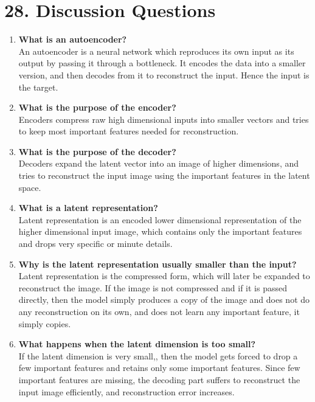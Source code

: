 \documentclass[10pt]{article}
\begin{document}
\section*{28. Discussion Questions}

\begin{enumerate}

\item \textbf{What is an autoencoder?}\\
An autoencoder is a neural network which reproduces its own input as its output by passing it through a bottleneck. It encodes the data into a smaller version, and then decodes from it to reconstruct the input. Hence the input is the target.\\

\item \textbf{What is the purpose of the encoder?}\\
Encoders compress raw high dimensional inputs into smaller vectors and tries to keep most important features needed for reconstruction. \\

\item \textbf{What is the purpose of the decoder?}\\
Decoders expand the latent vector into an image of higher dimensions, and tries to reconstruct the input image using the important features in the latent space.\\

\item \textbf{What is a latent representation?}\\
Latent representation is an encoded lower dimensional representation of the higher dimensional input image, which contains only the important features and drops very specific or minute details.\\

\item \textbf{Why is the latent representation usually smaller than the input?}\\
Latent representation is the compressed form, which will later be expanded to reconstruct the image. If the image is not compressed and if it is passed directly, then the model simply produces a copy of the image and does not do any reconstruction on its own, and does not learn any important feature, it simply copies.\\

\item \textbf{What happens when the latent dimension is too small?}\\
If the latent dimension is very small,, then the model gets forced to drop a few important features and retains only some important features. Since few important features are missing, the decoding part suffers to reconstruct the input image efficiently, and reconstruction error increases.\\


\end{enumerate}
\end{document}
